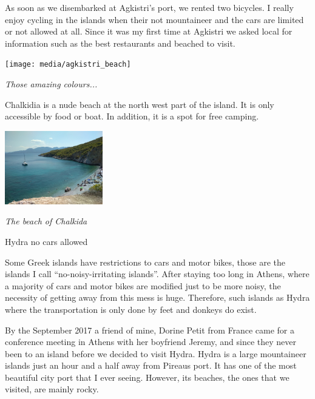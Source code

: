 \documentclass[10pt,a4paper]{article} %
\newcommand{\NewsItem}[1]{ %
\usefont{T1}{fvs}{n}{n} %
\vspace{24pt}\large #1\vspace{3pt} %
\par \normalsize \normalfont}
\begin{document}
\begin{multicols}{3}
As soon as we disembarked at Agkistri's port, we rented two bicycles. 
I really enjoy cycling in the islands when their not mountaineer and the cars 
are limited or not allowed at all.  
Since it was my first time at Agkistri we asked local for information such as 
the best restaurants and beached to visit. 

\begin{center}
	\texttt{[image: media/agkistri\_beach]}
	\par\textit{Those amazing colours...}
\end{center}


Chalkidia is a nude beach at the north west part of the island. 
It is only accessible by food or boat. 
In addition, it is a spot for free camping.

\begin{center}
	\includegraphics[width=0.32\textwidth]{media/chalkida_beach}
	\par\textit{The beach of Chalkida}
\end{center}


\NewsItem{Hydra no cars allowed}


Some Greek islands have restrictions to cars and motor bikes, those are the islands 
I call ``no-noisy-irritating islands''. 
After staying too long in Athens, where a majority of cars and motor bikes are modified 
just to be more noisy, the necessity of getting away from this mess is huge. 
Therefore, such islands as Hydra where the transportation is only done by feet and 
donkeys do exist. 


By the September 2017 a friend of mine, Dorine Petit from France came for a 
conference meeting in Athens with her boyfriend Jeremy, and since they 
never been to an island before we decided to visit Hydra. 
Hydra is a large mountaineer islands just an hour and a half away from Pireaus 
port. 
It has one of the most beautiful city port that I ever seeing. 
However, its beaches, the ones that we visited, are mainly rocky.  


\end{multicols}
\end{document}
